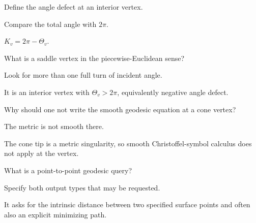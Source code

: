\begin{exercise}\label{exr:vii38-08}
Define the angle defect at an interior vertex.
\end{exercise}

\begin{hint}
Compare the total angle with \(2\pi\).
\end{hint}

\begin{solution}
\(K_v=2\pi-\Theta_v\).
\end{solution}

\begin{exercise}\label{exr:vii38-09}
What is a saddle vertex in the piecewise-Euclidean sense?
\end{exercise}

\begin{hint}
Look for more than one full turn of incident angle.
\end{hint}

\begin{solution}
It is an interior vertex with \(\Theta_v>2\pi\), equivalently negative angle defect.
\end{solution}

\begin{exercise}\label{exr:vii38-10}
Why should one not write the smooth geodesic equation at a cone vertex?
\end{exercise}

\begin{hint}
The metric is not smooth there.
\end{hint}

\begin{solution}
The cone tip is a metric singularity, so smooth Christoffel-symbol calculus does not apply at the vertex.
\end{solution}

\begin{exercise}\label{exr:vii38-11}
What is a point-to-point geodesic query?
\end{exercise}

\begin{hint}
Specify both output types that may be requested.
\end{hint}

\begin{solution}
It asks for the intrinsic distance between two specified surface points and often also an explicit minimizing path.
\end{solution}

